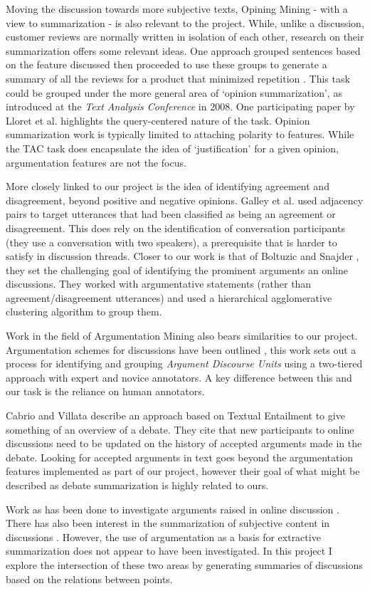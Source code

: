    Moving the discussion towards more subjective texts, Opining Mining - with a view to summarization - is also relevant to the project. While, unlike a discussion, customer reviews are normally written in isolation of each other, research on their summarization offers some relevant ideas. One approach grouped sentences based on the feature discussed then proceeded to use these groups to generate a summary of all the reviews for a product that minimized repetition \cite{hu2004mining}. This task could be grouped under the more general area of `opinion summarization', as introduced at the \textit{Text Analysis Conference} in 2008. One participating paper by Lloret et al. \cite{lloret2009towards} highlights the query-centered nature of the task. Opinion summarization work is typically limited to attaching polarity to features. While the TAC task does encapsulate the idea of `justification' for a given opinion, argumentation features are not the focus.

    More closely linked to our project is the idea of identifying agreement and disagreement, beyond positive and negative opinions. Galley et al. \cite{galley2004identifying} used adjacency pairs to target utterances that had been classified as being an agreement or disagreement. This does rely on the identification of conversation participants (they use a conversation with two speakers), a prerequisite that is harder to satisfy in discussion threads. Closer to our work is that of Boltuzic and Snajder \cite{boltuzic2015identifying}, they set the challenging goal of identifying the prominent arguments an online discussions. They worked with argumentative statements (rather than agreement/disagreement utterances) and used a hierarchical agglomerative clustering algorithm to group them.

    Work in the field of Argumentation Mining also bears similarities to our project. Argumentation schemes for discussions have been outlined \cite{ghosh2014analyzing}, this work sets out a process for identifying and grouping \textit{Argument Discourse Units} using a two-tiered approach with expert and novice annotators. A key difference between this and our task is the reliance on human annotators.

    Cabrio and Villata \cite{cabrio2012combining} describe an approach based on Textual Entailment to give something of an overview of a debate. They cite that new participants to online discussions need to be updated on the history of accepted arguments made in the debate. Looking for accepted arguments in text goes beyond the argumentation features implemented as part of our project, however their goal of what might be described as debate summarization is highly related to ours.

    Work as has been done to investigate arguments raised in online discussion \cite{boltuzic2015identifying,cabrio2012combining,ghosh2014analyzing}. There has also been interest in the summarization of subjective content in discussions \cite{hu2004mining,lloret2009towards,galley2004identifying}. However, the use of argumentation as a basis for extractive summarization does not appear to have been investigated. In this project I explore the intersection of these two areas by generating summaries of discussions based on the relations between points.
